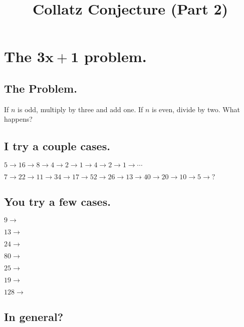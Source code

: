 \documentclass[12pt]{article}
\title{Collatz Conjecture (Part 2)}
\begin{document}
\Large

\section*{The $\mathbf{3x+1}$ problem.}

\subsection*{The Problem.}

If $n$ is odd, multiply by three and add one.  If $n$ is even, divide by two.  What happens?

\subsection*{I try a couple cases.}

\noindent $5 \to 16 \to 8 \to 4 \to 2 \to 1 \to 4 \to 2 \to 1 \to \cdots$

\noindent $7 \to 22 \to 11 \to 34 \to 17 \to 52 \to 26 \to 13 \to 40 \to 20 \to 10 \to 5 \to ?$

\subsection*{You try a few cases.}

\noindent $9 \to $
\vspace{3ex}

\noindent $13 \to$
\vspace{3ex}

\noindent $24 \to$
\vspace{3ex}

\noindent $80 \to$
\vspace{3ex}

\noindent $25 \to$
\vspace{3ex}

\noindent $19 \to$
\vspace{3ex}

\noindent $128 \to$
\vspace{3ex}

\subsection*{In general?}
\end{document}
